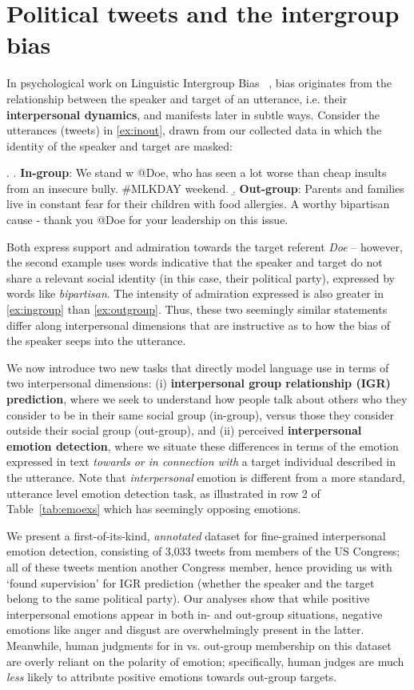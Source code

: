 \chapter{Political tweets and the intergroup bias}
\label{chapter:twitter}

In psychological work on Linguistic Intergroup Bias ~\citep{maass_linguistic_1999}, bias originates from the relationship between the speaker and target of an utterance, i.e. their \textbf{interpersonal dynamics}, and manifests later in  subtle ways. Consider the utterances (tweets) in \ref{ex:inout}, drawn from our collected data in which the identity of the speaker and target are masked:

\ex.
\label{ex:inout} \a.\label{ex:ingroup} \textbf{In-group}: We stand w\/ @Doe, who has seen a lot worse than cheap insults from an insecure bully. \#MLKDAY weekend.
\b.\label{ex:outgroup} \textbf{Out-group}: Parents and families live in constant fear for their children with food allergies. A worthy bipartisan cause - thank you @Doe for your leadership on this issue.


\noindent Both express support and admiration towards the target referent \emph{Doe} -- however, the second example uses words indicative that the speaker and target do not share a relevant social identity (in this case, their political party), expressed by words like \emph{bipartisan}. The intensity of admiration expressed is also greater in \ref{ex:ingroup} than \ref{ex:outgroup}. Thus, these two seemingly similar statements differ along interpersonal dimensions that are instructive as to how the bias of the speaker seeps into the utterance.

We now introduce two new tasks that directly model language use in terms of two interpersonal dimensions: (i) \textbf{interpersonal group relationship (IGR) prediction}, where we seek to understand how people talk about others who they consider to be in their same social group (in-group), versus those they consider outside their social group (out-group), and (ii) perceived \textbf{interpersonal emotion detection}, where we situate these differences in terms of the emotion expressed in text \emph{towards or in connection with} a target individual described in the utterance. Note that \emph{interpersonal} emotion is different from a more standard, utterance level emotion detection task, as illustrated in row 2 of Table~\ref{tab:emoexs} which has seemingly opposing emotions.

We present a first-of-its-kind, \emph{annotated} dataset for fine-grained interpersonal emotion detection, consisting of 3,033 tweets from members of the US Congress; all of these tweets mention another Congress member, hence providing us with `found supervision' for IGR prediction (whether the speaker and the target belong to the same political party). Our analyses show that while positive interpersonal emotions appear in both in- and out-group situations, negative emotions like anger and disgust are overwhelmingly present in the latter. Meanwhile, human judgments for in vs. out-group membership on this dataset are overly reliant on the polarity of emotion; specifically, human judges are much \emph{less} likely to attribute positive emotions towards out-group targets.

